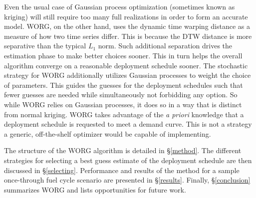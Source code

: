 Even the usual case of 
Gaussian process optimization (sometimes known as kriging) 
\cite{osborne2009gaussian,simpson2001kriging} will still 
require too many full realizations in order to form an accurate model.
WORG, on the other hand, uses the dynamic time warping distance as a 
measure of how two time series differ. This is because the DTW distance is 
more separative than the typical
$L_1$ norm. Such additional separation drives the estimation phase to make 
better choices
sooner. This in turn helps the overall algorithm converge on a reasonable 
deployment schedule sooner. 
The stochastic strategy for WORG additionally utilizes Gaussian processes to 
weight the choice of parameters. This guides the guesses for the deployment
schedules such that fewer guesses are needed while simultaneously 
not forbidding  
any option.  So while WORG relies on Gaussian processes, it does so in a way
that is distinct from normal kriging. WORG
takes advantage of the \emph{a priori} knowledge that a deployment 
schedule is requested to meet a demand curve. This is not a strategy a 
generic, off-the-shelf optimizer would be capable of implementing.

The structure of the WORG algorithm is detailed in \S\ref{method}. 
The different strategies for selecting a best guess estimate of the 
deployment schedule are then discussed in \S\ref{selecting}. Performance
and results of the method for a sample once-through fuel cycle scenario 
are presented in \S\ref{results}. Finally, \S\ref{conclusion} summarizes
WORG and lists opportunities for future work.
